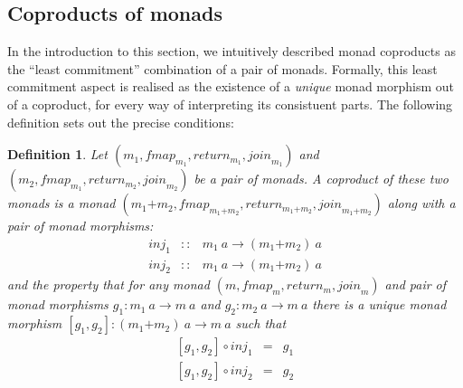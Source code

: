 \documentclass{jfp1}
\newtheorem{definition}{Definition}
\begin{document}
\subsection{Coproducts of monads}
\label{sec:coproducts-of-monads}

\newcommand{\cprd}[2]{#1\mathord{+}#2}

In the introduction to this section, we intuitively described monad
coproducts as the ``least commitment'' combination of a pair of
monads. Formally, this least commitment aspect is realised as the
existence of a \emph{unique} monad morphism out of a coproduct, for
every way of interpreting its consistuent parts. The following
definition sets out the precise conditions:
\begin{definition}\label{defn:coproducts}
  Let $(m_1, \mathit{fmap}_{m_1}, \mathit{return}_{m_1}, \mathit{join}_{m_1})$ and $(m_2,
  \mathit{fmap}_{m_1}, \mathit{return}_{m_2}, \mathit{join}_{m_2})$ be a pair of monads. A \emph{coproduct} of these two monads is a
  monad $(\cprd{m_1}{m_2}, \mathit{fmap}_{\cprd{m_1}{m_2}}, \mathit{return}_{\cprd{m_1}{m_2}},
  \mathit{join}_{\cprd{m_1}{m_2}})$ along with a pair of monad morphisms:
  \begin{displaymath}
    \begin{array}{rcl}
      \mathit{inj}_1 & :: & m_1~a \to (\cprd{m_1}{m_2})~a \\
      \mathit{inj}_2 & :: & m_1~a \to (\cprd{m_1}{m_2})~a
    \end{array}
  \end{displaymath}
  and the property that for any monad $(m,\mathit{fmap}_m,
  \mathit{return}_m, \mathit{join}_m)$ and pair of monad morphisms
  $g_1 : m_1~a \to m~a$ and $g_2 : m_2~a \to m~a$ there is a
  \emph{unique} monad morphism $[g_1,g_2] : (\cprd{m_1}{m_2})~a \to
  m~a$ such that
  \begin{displaymath}
    \begin{array}{rcl}
      {}[g_1,g_2] \circ \mathit{inj}_1 & = & g_1 \\
      {}[g_1,g_2] \circ \mathit{inj}_2 & = & g_2
    \end{array}
  \end{displaymath}
\end{definition}
\end{document}
